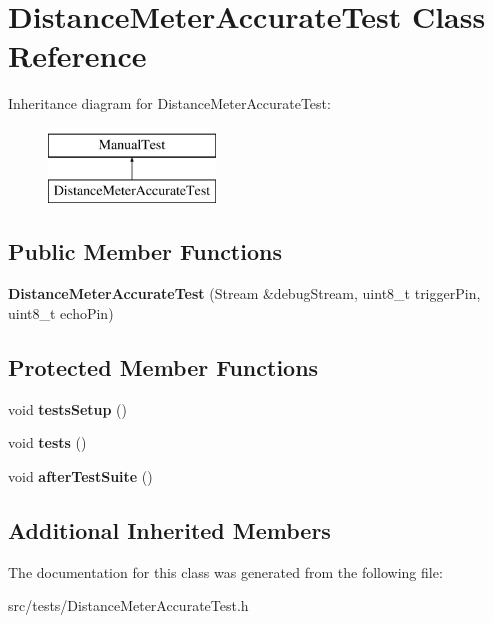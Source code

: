 \hypertarget{class_distance_meter_accurate_test}{}\section{Distance\+Meter\+Accurate\+Test Class Reference}
\label{class_distance_meter_accurate_test}
Inheritance diagram for Distance\+Meter\+Accurate\+Test\+:\begin{figure}[H]
\begin{center}
\leavevmode
\includegraphics[height=2.000000cm]{class_distance_meter_accurate_test}
\end{center}
\end{figure}
\subsection*{Public Member Functions}
\begin{DoxyCompactItemize}
\item 
\mbox{\label{class_distance_meter_accurate_test_ab314a0053071be9721fe8855441fea70}} 
{\bfseries Distance\+Meter\+Accurate\+Test} (Stream \&debug\+Stream, uint8\+\_\+t trigger\+Pin, uint8\+\_\+t echo\+Pin)
\end{DoxyCompactItemize}
\subsection*{Protected Member Functions}
\begin{DoxyCompactItemize}
\item 
\mbox{\label{class_distance_meter_accurate_test_a781964e2565583c4c6a7335f1ea9ad72}} 
void {\bfseries tests\+Setup} ()
\item 
\mbox{\label{class_distance_meter_accurate_test_a02f8725ccf6f0e1bbf83b4e6b1b4b1a5}} 
void {\bfseries tests} ()
\item 
\mbox{\label{class_distance_meter_accurate_test_aa5b8d56dd845c4bc3d2cd9dc191c05e1}} 
void {\bfseries after\+Test\+Suite} ()
\end{DoxyCompactItemize}
\subsection*{Additional Inherited Members}


The documentation for this class was generated from the following file\+:\begin{DoxyCompactItemize}
\item 
src/tests/Distance\+Meter\+Accurate\+Test.\+h\end{DoxyCompactItemize}
